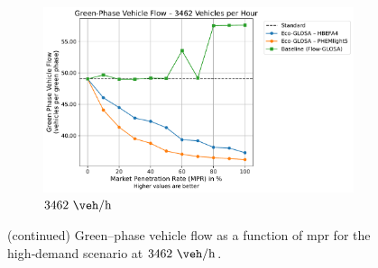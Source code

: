\begin{figure}[htbp]\ContinuedFloat
  \centering
  \begin{subfigure}[t]{0.98\textwidth}
    \includegraphics[width=\textwidth]{data/img/GreenPhaseVehicleFlow/GreenPhaseVehicleFlow_Cars2500.pdf}
    \caption{$3462~\unit{\veh\per\hour}$}
    \label{fig:flow_3462}
  \end{subfigure}
  \caption[]{%
    (continued) Green–phase vehicle flow as a function of \ac{mpr} for the high‐demand scenario at $3462~\unit{\veh\per\hour}$.%
  }
\end{figure}

